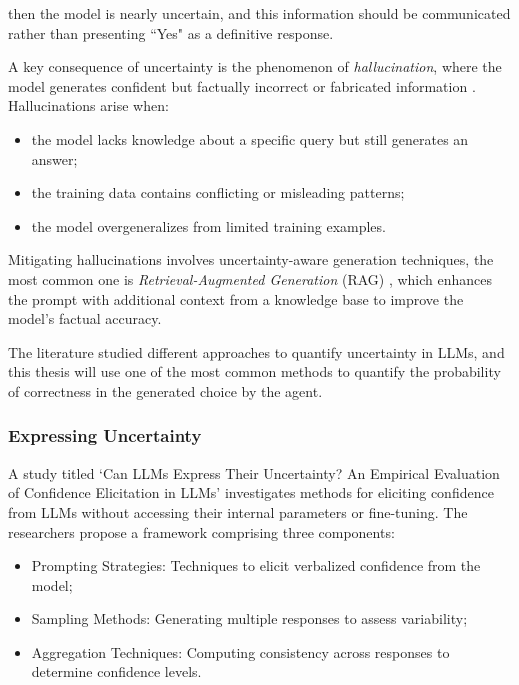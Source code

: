 then the model is nearly uncertain, and this information should be communicated rather
than presenting ``Yes" as a definitive response.

A key consequence of uncertainty is the phenomenon of \emph{hallucination},
where the model generates confident but factually incorrect or fabricated
information \cite{Ji_2023}. Hallucinations arise when:
\begin{itemize}
  \item the model lacks knowledge about a specific query but still generates an answer;

  \item the training data contains conflicting or misleading patterns;

  \item the model overgeneralizes from limited training examples.
\end{itemize}

Mitigating hallucinations involves uncertainty-aware generation techniques, the
most common one is \emph{Retrieval-Augmented Generation} (RAG) \cite{lewis2021retrievalaugmentedgenerationknowledgeintensivenlp},
which enhances the prompt with additional context from a knowledge base to
improve the model's factual accuracy.

The literature studied different approaches to quantify uncertainty in LLMs, and
this thesis will use one of the most common methods to quantify the probability of
correctness in the generated choice by the agent.

\subsubsection{Expressing Uncertainty}
A study titled `Can LLMs Express Their Uncertainty? An Empirical Evaluation of Confidence
Elicitation in LLMs' \cite{xiong2024llmsexpressuncertaintyempirical}
investigates methods for eliciting confidence from LLMs without accessing their
internal parameters or fine-tuning. The researchers propose a framework comprising
three components:
\begin{itemize}
  \item Prompting Strategies: Techniques to elicit verbalized confidence from
    the model;

  \item Sampling Methods: Generating multiple responses to assess variability;

  \item Aggregation Techniques: Computing consistency across responses to
    determine confidence levels.
\end{itemize}

